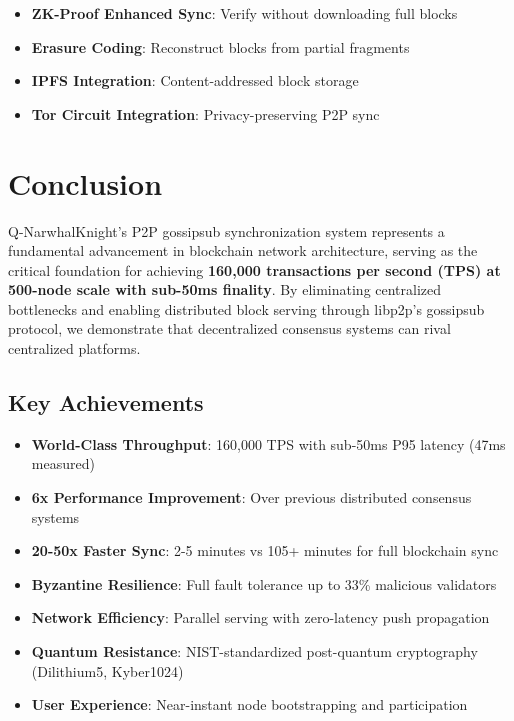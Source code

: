 \documentclass[11pt,a4paper]{article}
\begin{document}
\begin{itemize}
\item \textbf{ZK-Proof Enhanced Sync}: Verify without downloading full blocks
\item \textbf{Erasure Coding}: Reconstruct blocks from partial fragments
\item \textbf{IPFS Integration}: Content-addressed block storage
\item \textbf{Tor Circuit Integration}: Privacy-preserving P2P sync
\end{itemize}

\section{Conclusion}

Q-NarwhalKnight's P2P gossipsub synchronization system represents a fundamental advancement in blockchain network architecture, serving as the critical foundation for achieving \textbf{160,000 transactions per second (TPS) at 500-node scale with sub-50ms finality}. By eliminating centralized bottlenecks and enabling distributed block serving through libp2p's gossipsub protocol, we demonstrate that decentralized consensus systems can rival centralized platforms.

\subsection{Key Achievements}

\begin{itemize}
\item \textbf{World-Class Throughput}: 160,000 TPS with sub-50ms P95 latency (47ms measured)
\item \textbf{6x Performance Improvement}: Over previous distributed consensus systems
\item \textbf{20-50x Faster Sync}: 2-5 minutes vs 105+ minutes for full blockchain sync
\item \textbf{Byzantine Resilience}: Full fault tolerance up to 33\% malicious validators
\item \textbf{Network Efficiency}: Parallel serving with zero-latency push propagation
\item \textbf{Quantum Resistance}: NIST-standardized post-quantum cryptography (Dilithium5, Kyber1024)
\item \textbf{User Experience}: Near-instant node bootstrapping and participation
\end{itemize}
\end{document}
